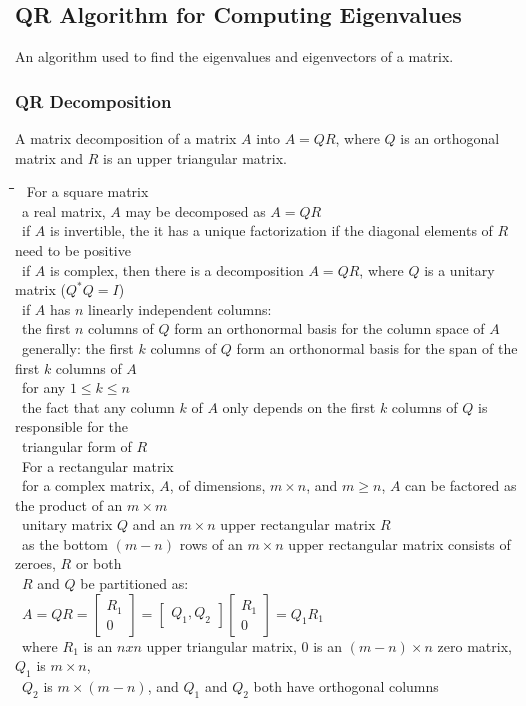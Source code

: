 \documentclass[10pt,letterpaper]{scrartcl}
\newcommand{\tbul}{\textbullet}
\newcommand{\tend}{\>\textendash}
\newcommand{\tasc}{\>\>\textasteriskcentered}
\newcommand{\tpec}{\>\>\>\textperiodcentered}
\newcommand{\tabDef}{\hspace{2em}\=\hspace{2em}\=\hspace{2em}\=\hspace{2em}\=\kill}
\begin{document}
\subsection{QR Algorithm for Computing Eigenvalues}
An algorithm used to find the eigenvalues and eigenvectors of a matrix.
\subsubsection{QR Decomposition}
A matrix decomposition of a matrix $A$ into $A=QR$, where $Q$ is an orthogonal matrix and $R$ is an upper triangular matrix.
\begin{tabbing}\tabDef 
	\tbul\ For a square matrix \\
	\tend\ a real matrix, $A$ may be decomposed as $A=QR$\\
	\tend\ if $A$ is invertible, the it has a unique factorization if the diagonal elements of $R$ need to be positive \\
	\tend\ if $A$ is complex, then there is a decomposition $A=QR$, where $Q$ is a unitary matrix ($Q^*Q=I$) \\
	\tend\ if $A$ has $n$ linearly independent columns:\\
	\tasc\ the first $n$ columns of $Q$ form an orthonormal basis for the column space of $A$ \\
	\tpec\ generally: the first $k$ columns of $Q$ form an orthonormal basis for the span of the first $k$ columns of $A$ \\ \>\>\>\ for any $1\leq k\leq n$ \\
	\tpec\ the fact that any column $k$ of $A$ only depends on the first $k$ columns of $Q$ is responsible for the \\ \>\>\>\ triangular form of $R$ \\
	\tbul\ For a rectangular matrix \\
	\tend\ for a complex matrix, $A$, of dimensions, $m\times n$, and $m\geq n$, $A$ can be factored as the product of an $m\times m$ \\ \>\ unitary matrix $Q$ and an $m\times n$ upper rectangular matrix $R$ \\
	\tend\ as the bottom $(m-n)$ rows of an $m\times n$ upper rectangular matrix consists of zeroes, $R$ or both \\ \>\ $R$ and $Q$ be partitioned as: \\ 
	\>\>\>\ $A = QR = \begin{bmatrix} R_1 \\ 0 \end{bmatrix} = \begin{bmatrix} Q_1, Q_2 \end{bmatrix} \begin{bmatrix} R_1 \\ 0 \end{bmatrix} = Q_1 R_1$  \\
	\>\>\ where $R_1$ is an $nxn$ upper triangular matrix, 0 is an $(m-n)\times n$ zero matrix, $Q_1$ is $m\times n$, \\ \>\>\ $Q_2$ is $m\times (m-n)$, and $Q_1$ and $Q_2$ both have orthogonal columns \\
\end{tabbing}
\end{document}
